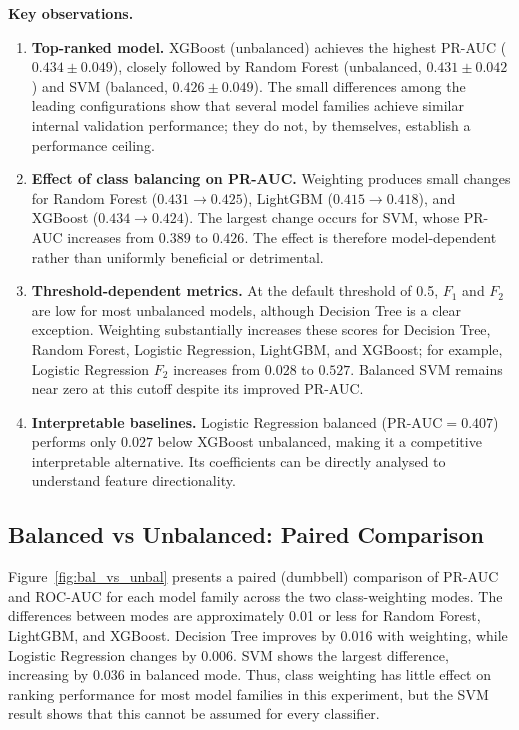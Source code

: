 \clearpage
\noindent\textbf{Key observations.}
\begin{enumerate}
  \item \textbf{Top-ranked model.} XGBoost (unbalanced) achieves the highest PR-AUC ($0.434 \pm 0.049$), closely followed by Random Forest (unbalanced, $0.431 \pm 0.042$) and SVM (balanced, $0.426 \pm 0.049$).
    The small differences among the leading configurations show that several model families achieve similar internal validation performance; they do not, by themselves, establish a performance ceiling.
  \item \textbf{Effect of class balancing on PR-AUC.} Weighting produces small changes for Random Forest ($0.431 \to 0.425$), LightGBM ($0.415 \to 0.418$), and XGBoost ($0.434 \to 0.424$). The largest change occurs for SVM, whose PR-AUC increases from $0.389$ to $0.426$. The effect is therefore model-dependent rather than uniformly beneficial or detrimental.
  \item \textbf{Threshold-dependent metrics.} At the default threshold of 0.5, $F_1$ and $F_2$ are low for most unbalanced models, although Decision Tree is a clear exception. Weighting substantially increases these scores for Decision Tree, Random Forest, Logistic Regression, LightGBM, and XGBoost; for example, Logistic Regression $F_2$ increases from $0.028$ to $0.527$. Balanced SVM remains near zero at this cutoff despite its improved PR-AUC.
  \item \textbf{Interpretable baselines.} Logistic Regression balanced ($\text{PR-AUC} = 0.407$) performs only $0.027$ below XGBoost unbalanced, making it a competitive interpretable alternative.
    Its coefficients can be directly analysed to understand feature directionality.
\end{enumerate}


\subsection{Balanced vs Unbalanced: Paired Comparison}
\label{subsec:results_bal_vs_unbal}

Figure~\ref{fig:bal_vs_unbal} presents a paired (dumbbell) comparison of PR-AUC and ROC-AUC for each model family across the two class-weighting modes.
The differences between modes are approximately 0.01 or less for Random Forest, LightGBM, and XGBoost. Decision Tree improves by 0.016 with weighting, while Logistic Regression changes by 0.006. SVM shows the largest difference, increasing by 0.036 in balanced mode. Thus, class weighting has little effect on ranking performance for most model families in this experiment, but the SVM result shows that this cannot be assumed for every classifier.

